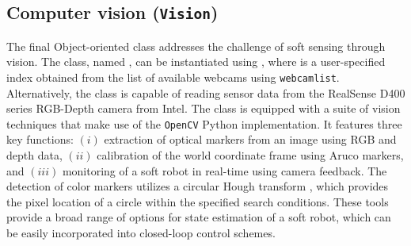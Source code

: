 \subsection{Computer vision (\texttt{Vision})}
\label{sec:C5:vision}
The final Object-oriented class addresses the challenge of soft sensing through vision. The class, named , can be instantiated using , where  is a user-specified index obtained from the list of available webcams using \texttt{webcamlist}. Alternatively, the  class is capable of reading sensor data from the RealSense D400 series RGB-Depth camera from Intel. The class is equipped with a suite of vision techniques that make use of the \texttt{OpenCV} Python implementation. It features three key functions: $(i)$ extraction of optical markers from an image using RGB and depth data, $(ii)$ calibration of the world coordinate frame using Aruco markers, and $(iii)$ monitoring of a soft robot in real-time using camera feedback. The detection of color markers utilizes a circular Hough transform \cite{Illingworth1987Sep}, which provides the pixel location of a circle within the specified search conditions. These tools provide a broad range of options for state estimation of a soft robot, which can be easily incorporated into closed-loop control schemes.


